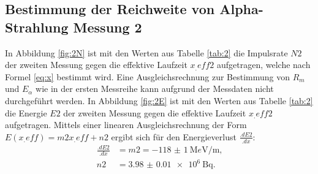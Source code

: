 \subsection{Bestimmung der Reichweite von Alpha-Strahlung Messung 2}

In Abbildung \ref{fig:2N} ist mit den Werten aus Tabelle \ref{tab:2} die Impulsrate $N2$ der zweiten Messung gegen die effektive Laufzeit $x_.{eff2}$ aufgetragen, welche nach Formel \eqref{eq:x} bestimmt wird. Eine Ausgleichsrechnung zur Bestimmung von $R_m$ und $E_\alpha$ wie in der ersten Messreihe kann aufgrund der Messdaten nicht durchgeführt werden.
In Abbildung \ref{fig:2E} ist mit den Werten aus Tabelle \ref{tab:2} die Energie $E2$ der zweiten Messung gegen die effektive Laufzeit $x_.{eff2}$ aufgetragen.
Mittels einer linearen Ausgleichsrechnung der Form $E(x_.{eff})=m2 x_.{eff} +n2$ ergibt sich für den Energieverlust $\frac{.dE2}{.dx}$:
\begin{align*}
\frac{.dE2}{.dx}	&= m2 = \SI{-118(1)}{\mega e\volt\per\metre}\text{,}\\
n2	&= \SI{3.98(1)e6}{\becquerel}\text{.}
\end{align*}

